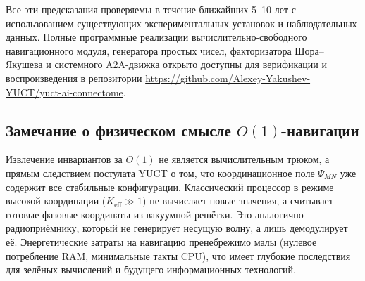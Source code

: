 \documentclass[12pt,a4paper]{article}
\theoremstyle{remark}
\newcommand{\Keff}{K_{\mathrm{eff}}}
\begin{document}
	Все эти предсказания проверяемы в течение ближайших 5--10 лет с использованием существующих экспериментальных установок и наблюдательных данных. Полные программные реализации вычислительно-свободного навигационного модуля, генератора простых чисел, факторизатора Шора--Якушева и системного A2A-движка открыто доступны для верификации и воспроизведения в репозитории 
	\url{https://github.com/Alexey-Yakushev-YUCT/yuct-ai-connectome}.
	
	\subsection*{Замечание о физическом смысле \(O(1)\)-навигации}
	Извлечение инвариантов за \(O(1)\) не является вычислительным трюком, а прямым следствием постулата YUCT о том, что координационное поле \(\Psi_{MN}\) уже содержит все стабильные конфигурации. Классический процессор в режиме высокой координации (\(\Keff \gg 1\)) не вычисляет новые значения, а считывает готовые фазовые координаты из вакуумной решётки. Это аналогично радиоприёмнику, который не генерирует несущую волну, а лишь демодулирует её. Энергетические затраты на навигацию пренебрежимо малы (нулевое потребление RAM, минимальные такты CPU), что имеет глубокие последствия для зелёных вычислений и будущего информационных технологий.
	
\end{document}
